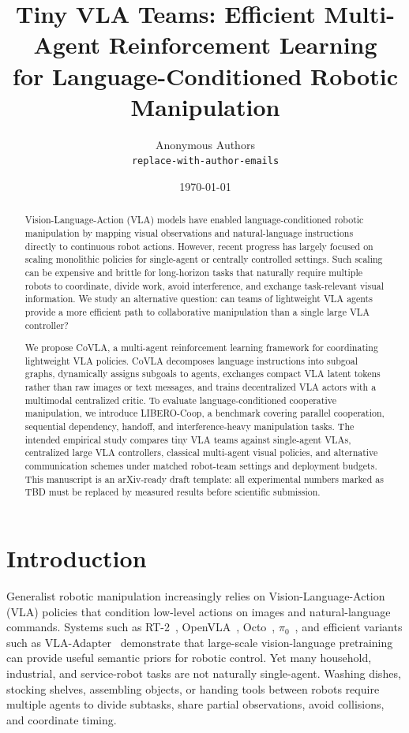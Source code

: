 \documentclass[11pt]{article}
\title{\textbf{Tiny VLA Teams: Efficient Multi-Agent Reinforcement Learning\\
for Language-Conditioned Robotic Manipulation}}
\author{
Anonymous Authors\\
\texttt{replace-with-author-emails}
}
\date{\today}
\newcommand{\method}{CoVLA}
\newcommand{\liberocoop}{LIBERO-Coop}
\begin{document}
\maketitle

\begin{abstract}
Vision-Language-Action (VLA) models have enabled language-conditioned robotic manipulation by mapping visual observations and natural-language instructions directly to continuous robot actions. However, recent progress has largely focused on scaling monolithic policies for single-agent or centrally controlled settings. Such scaling can be expensive and brittle for long-horizon tasks that naturally require multiple robots to coordinate, divide work, avoid interference, and exchange task-relevant visual information. We study an alternative question: can teams of lightweight VLA agents provide a more efficient path to collaborative manipulation than a single large VLA controller?

We propose \method{}, a multi-agent reinforcement learning framework for coordinating lightweight VLA policies. \method{} decomposes language instructions into subgoal graphs, dynamically assigns subgoals to agents, exchanges compact VLA latent tokens rather than raw images or text messages, and trains decentralized VLA actors with a multimodal centralized critic. To evaluate language-conditioned cooperative manipulation, we introduce \liberocoop{}, a benchmark covering parallel cooperation, sequential dependency, handoff, and interference-heavy manipulation tasks. The intended empirical study compares tiny VLA teams against single-agent VLAs, centralized large VLA controllers, classical multi-agent visual policies, and alternative communication schemes under matched robot-team settings and deployment budgets. This manuscript is an arXiv-ready draft template: all experimental numbers marked as TBD must be replaced by measured results before scientific submission.
\end{abstract}

\section{Introduction}

Generalist robotic manipulation increasingly relies on Vision-Language-Action (VLA) policies that condition low-level actions on images and natural-language commands. Systems such as RT-2~\citep{brohan2023rt2}, OpenVLA~\citep{kim2024openvla}, Octo~\citep{octo2024}, $\pi_0$~\citep{black2024pi0}, and efficient variants such as VLA-Adapter~\citep{wang2025vlaadapter} demonstrate that large-scale vision-language pretraining can provide useful semantic priors for robotic control. Yet many household, industrial, and service-robot tasks are not naturally single-agent. Washing dishes, stocking shelves, assembling objects, or handing tools between robots require multiple agents to divide subtasks, share partial observations, avoid collisions, and coordinate timing.
\end{document}
